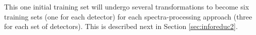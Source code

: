 
%

This one initial training set will undergo several transformations to become
six training sets (one for each detector) for each spectra-processing approach
(three for each set of detectors).  This is described next in Section
\ref{sec:inforeduc2}.

